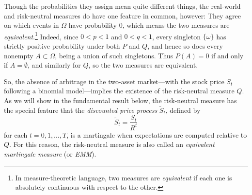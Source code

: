 \documentclass[11pt, openany, oneside]{book}
\theoremstyle{definition}
\theoremstyle{remark}
\theoremstyle{boldital}
\numberwithin{equation}{section}
\begin{document}
Though the probabilities they assign mean quite different things, the real-world and risk-neutral measures do have one feature in common, however: They agree on which events in $\Omega$ have probability $0$, which means the two measures are \textit{equivalent}.\footnote{In measure-theoretic language, two measures are \textit{equivalent} if each one is absolutely continuous with respect to the other.} Indeed, since $0<p<1$ and $0<q<1$, every singleton $\{\omega\}$ has strictly positive probability under both $P$ and $Q$, and hence so does every nonempty $A \subset \Omega$, being a union of such singletons. Thus $P(A)=0$ if and only if $A=\emptyset$, and similarly for $Q$, so the two measures are equivalent.

So, the absence of arbitrage in the two-asset market---with the stock price $S_t$ following a binomial model---implies the existence of the risk-neutral measure $Q$. As we will show in the fundamental result below, the risk-neutral measure has the special feature that the \textit{discounted price process} $\tilde{S}_t$, defined by 
	\[
	\tilde{S}_t = \frac{S_t}{R^t}
	\]
for each $t=0,1,\ldots,T$, is a martingale when expectations are computed relative to $Q$. For this reason, the risk-neutral measure is also called an \textit{equivalent martingale measure} (or \textit{EMM}).
\end{document}
